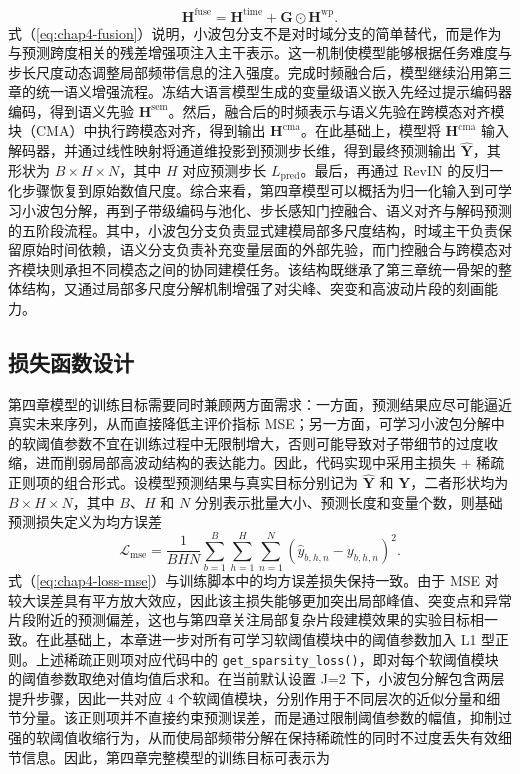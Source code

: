 \begin{equation}
\mathbf{H}^{\mathrm{fuse}}
=\mathbf{H}^{\mathrm{time}}+\mathbf{G}\odot\mathbf{H}^{\mathrm{wp}}.
\label{eq:chap4-fusion}
\end{equation}
式（\ref{eq:chap4-fusion}）说明，小波包分支不是对时域分支的简单替代，而是作为与预测跨度相关的残差增强项注入主干表示。这一机制使模型能够根据任务难度与步长尺度动态调整局部频带信息的注入强度。完成时频融合后，模型继续沿用第三章的统一语义增强流程。冻结大语言模型生成的变量级语义嵌入先经过提示编码器编码，得到语义先验 $\mathbf{H}^{\mathrm{sem}}$。然后，融合后的时频表示与语义先验在跨模态对齐模块（CMA）中执行跨模态对齐，得到输出 $\mathbf{H}^{\mathrm{cma}}$。在此基础上，模型将 $\mathbf{H}^{\mathrm{cma}}$ 输入解码器，并通过线性映射将通道维投影到预测步长维，得到最终预测输出 $\hat{\mathbf{Y}}$，其形状为 $B\times H\times N$，其中 $H$ 对应预测步长 $L_{\mathrm{pred}}$。最后，再通过 RevIN 的反归一化步骤恢复到原始数值尺度。综合来看，第四章模型可以概括为归一化输入到可学习小波包分解，再到子带级编码与池化、步长感知门控融合、语义对齐与解码预测的五阶段流程。其中，小波包分支负责显式建模局部多尺度结构，时域主干负责保留原始时间依赖，语义分支负责补充变量层面的外部先验，而门控融合与跨模态对齐模块则承担不同模态之间的协同建模任务。该结构既继承了第三章统一骨架的整体结构，又通过局部多尺度分解机制增强了对尖峰、突变和高波动片段的刻画能力。 \subsection{损失函数设计} 第四章模型的训练目标需要同时兼顾两方面需求：一方面，预测结果应尽可能逼近真实未来序列，从而直接降低主评价指标 MSE；另一方面，可学习小波包分解中的软阈值参数不宜在训练过程中无限制增大，否则可能导致对子带细节的过度收缩，进而削弱局部高波动结构的表达能力。因此，代码实现中采用主损失 + 稀疏正则项的组合形式。设模型预测结果与真实目标分别记为 $\hat{\mathbf{Y}}$ 和 $\mathbf{Y}$，二者形状均为 $B\times H\times N$，其中 $B$、$H$ 和 $N$ 分别表示批量大小、预测长度和变量个数，则基础预测损失定义为均方误差
\begin{equation}
\mathcal{L}_{\mathrm{mse}}
=\frac{1}{BHN}
\sum_{b=1}^{B}\sum_{h=1}^{H}\sum_{n=1}^{N}
\left(\widehat{y}_{b,h,n}-y_{b,h,n}\right)^2.
\label{eq:chap4-loss-mse}
\end{equation}
式（\ref{eq:chap4-loss-mse}）与训练脚本中的均方误差损失保持一致。由于 MSE 对较大误差具有平方放大效应，因此该主损失能够更加突出局部峰值、突变点和异常片段附近的预测偏差，这也与第四章关注局部复杂片段建模效果的实验目标相一致。在此基础上，本章进一步对所有可学习软阈值模块中的阈值参数加入 L1 型正则。上述稀疏正则项对应代码中的 \texttt{get\_sparsity\_loss()}，即对每个软阈值模块的阈值参数取绝对值均值后求和。在当前默认设置 J=2 下，小波包分解包含两层提升步骤，因此一共对应 4 个软阈值模块，分别作用于不同层次的近似分量和细节分量。该正则项并不直接约束预测误差，而是通过限制阈值参数的幅值，抑制过强的软阈值收缩行为，从而使局部频带分解在保持稀疏性的同时不过度丢失有效细节信息。因此，第四章完整模型的训练目标可表示为
